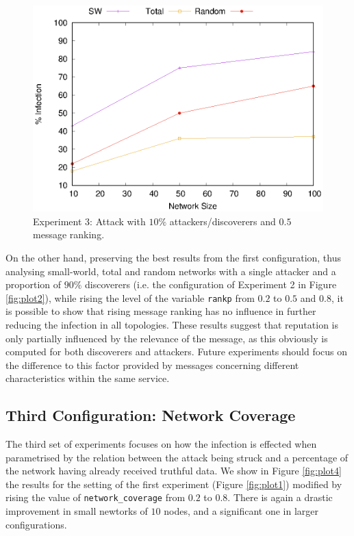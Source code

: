 \documentclass[compsoc, conference, letterpaper, 10pt, times]{IEEEtran}
\begin{document}
\begin{figure}
\includegraphics[scale=0.70]{3rdconfig_10_90}
\caption{Experiment 3: Attack with $10\%$ attackers/discoverers and $0.5$ message ranking.}\label{fig:plot3}
\end{figure}
On the other hand, preserving the best results from the first configuration, thus analysing small-world, total and random networks with a single attacker and a proportion of $90\%$ discoverers (i.e. the configuration of Experiment 2 in Figure \ref{fig:plot2}), while rising the level of the variable \texttt{rankp} from $0.2$ to $0.5$ and $0.8$, it is possible to show that rising message ranking has no influence in further reducing the infection in all topologies. These results suggest that reputation is only partially influenced by the relevance of the message, as this obviously is computed for both discoverers and attackers. Future experiments should focus on the difference to this factor provided by messages concerning different characteristics within the same service.


\subsection{Third Configuration: Network Coverage}

The third set of experiments focuses on how the infection is effected when parametrised by the relation between the attack being struck and a percentage of the network having already received  truthful data. We show in Figure \ref{fig:plot4} the results for the setting of the first experiment (Figure \ref{fig:plot1}) modified by rising the value of  \texttt{network\_coverage} from $0.2$ to $0.8$. There is again a drastic improvement in small newtorks of $10$ nodes, and a significant one in larger configurations.
\end{document}
